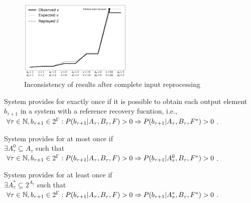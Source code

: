 \begin{figure}[htbp]
  \centering
  \includegraphics[width=0.48\textwidth]{pics/failure}
  \caption{Inconsistency of results after complete input reprocessing}
  \label {state-inconsistency}
\end{figure}

\begin{definition}{System provides for exactly once}
if it is possible to obtain each output element $b_{\tau+1}$ in a system with a reference recovery fucntion, i.e.,\\ 
$\forall{\tau \in \mathbb{N}}, b_{\tau+1}\in 2^{\Gamma}: P(b_{\tau+1}|A_{\tau},B_\tau,F)>0 \Rightarrow \\ P(b_{\tau+1}|A_{\tau},B_\tau,F^{*})>0$.
\end{definition}

\begin{definition}{System provides for at most once}
if \\
$\exists{A^{0}_{\tau}\subseteq{A_{\tau}}}$ such that \\
$\forall{\tau \in \mathbb{N},{b_{\tau+1}\in 2^{\Gamma}}}: P(b_{\tau+1}|A_{\tau},B_\tau,F)>0 \Rightarrow \\ P(b_{\tau+1}|A^{0}_{\tau},B_\tau,F^{*})>0$.
\end{definition}

\begin{definition}{System provides for at least once}
if \\
$\exists{A^{*}_{\tau}\subseteq{2^{A_{\tau}}}}$ such that \\
$\forall{\tau \in \mathbb{N}, {b_{\tau+1} \in 2^{\Gamma}}}: P(b_{\tau+1}|A_{\tau},B_\tau,F)>0 \Rightarrow \\ P(b_{\tau+1}|A^{*}_{\tau},B_\tau,F^{*})>0$.
\end{definition}

